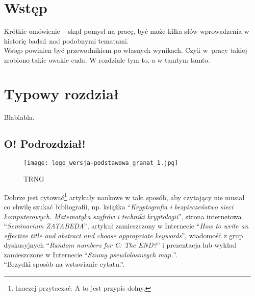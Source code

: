 \documentclass[12pt,a4paper,leqno,oneside,titlepage]{book}
\begin{document}
\mainmatter

\chapter*{Wstęp}

Krótkie omówienie -- skąd pomysł na pracę, być może kilka słów wprowadzenia w historię badań nad podobnymi tematami.\\

Wstęp powinien być przewodnikiem po własnych wynikach. Czyli w~pracy takiej zrobiono takie owakie cuda. W rozdziale tym to, a w tamtym tamto.

\chapter{Typowy rozdział}

Blablabla.

\section{O! Podrozdział!}

\begin{figure}[h!]
  \centering
    \texttt{[image: logo\_wersja-podstawowa\_granat\_1.jpg]}
  \caption{TRNG\cite{Stallings11kryptografia}}
\end{figure}

Dobrze jest cytować\footnote{Inaczej przytaczać. A to jest przypis dolny.} artykuły naukowe w taki sposób, aby czytający nie musiał co chwilę szukać bibliografii, np. książka ``\textit{Kryptografia i bezpieczeństwo sieci komputerowych. Matematyka szyfrów i techniki kryptologii}''\cite{Stallings11kryptografia}, strona internetowa ``\textit{Seminarium ZATABEDA}''\cite{Gogolewski13seminarium}, artykuł zamieszczony w Internecie ``\textit{How to write an effective title and abstract and choose appropriate keywords}''\cite{Rodrigues13howtowrite}, wiadomość z grup dyskusyjnych ``\textit{Random numbers for C: The END?}''\cite{Marsaglia99randomnum} i prezentacja lub wykład zamieszczone w Internecie ``\textit{Szumy pseudolosowych map.}''\cite{Hanc15szumy}.\\

``Brzydki sposób na wstawianie cytatu.''.
\end{document}
